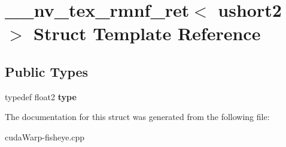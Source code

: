 \hypertarget{struct____nv__tex__rmnf__ret_3_01ushort2_01_4}{}\section{\+\_\+\+\_\+nv\+\_\+tex\+\_\+rmnf\+\_\+ret$<$ ushort2 $>$ Struct Template Reference}
\label{struct____nv__tex__rmnf__ret_3_01ushort2_01_4}
\subsection*{Public Types}
\begin{DoxyCompactItemize}
\item 
typedef float2 {\bfseries type}\hypertarget{struct____nv__tex__rmnf__ret_3_01ushort2_01_4_af60130aa55fc9b59ea219d200f3fa1a7}{}\label{struct____nv__tex__rmnf__ret_3_01ushort2_01_4_af60130aa55fc9b59ea219d200f3fa1a7}

\end{DoxyCompactItemize}


The documentation for this struct was generated from the following file\+:\begin{DoxyCompactItemize}
\item 
cuda\+Warp-\/fisheye.\+cpp\end{DoxyCompactItemize}
